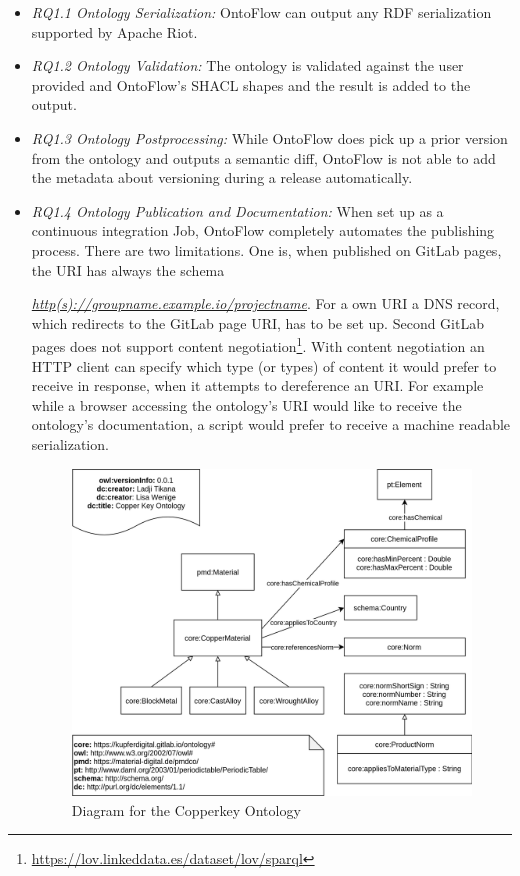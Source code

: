 \documentclass[sigconf]{acmart}
\begin{document}
\begin{itemize}[leftmargin=*]
\item \textit{RQ1.1 Ontology Serialization:} OntoFlow can output any RDF serialization supported by Apache Riot.
\item \textit{RQ1.2 Ontology Validation:} The ontology is validated against the user provided and OntoFlow's SHACL shapes and the result is added to the output.
\item \textit{RQ1.3 Ontology Postprocessing:} While OntoFlow does pick up a prior version from the ontology and outputs a semantic diff, OntoFlow is not able to add the metadata about versioning during a release automatically.
\item \textit{RQ1.4 Ontology Publication and Documentation:} When set up as a continuous integration Job, OntoFlow completely automates the publishing process. There are two limitations. One is, when published on GitLab pages, the URI has always the schema  

  \mbox{\textit{\url{http(s)://groupname.example.io/projectname}}}. For a own URI a DNS record, which redirects to the GitLab page URI, has to be set up. Second GitLab pages does not support content negotiation\footnote{\url{https://lov.linkeddata.es/dataset/lov/sparql}}. With content negotiation an HTTP client can specify which type (or types) of content it would prefer to receive in response, when it attempts to dereference an URI. For example while a browser accessing the ontology's URI would like to receive the ontology's documentation, a script would prefer to receive a machine readable serialization. 

 \begin{figure}[h]
  \centering
  \includegraphics[width=\columnwidth]{copperkey.png}
  \caption{Diagram for the Copperkey Ontology}
  \label{fig:copperkey}
\end{figure}


\end{itemize}
\end{document}
